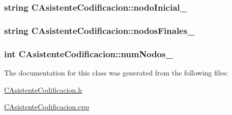 \subsubsection[{\texorpdfstring{nodo\+Inicial\+\_\+}{nodoInicial_}}]{\setlength{\rightskip}{0pt plus 5cm}string C\+Asistente\+Codificacion\+::nodo\+Inicial\+\_\+\hspace{0.3cm}{\ttfamily [private]}}\hypertarget{classCAsistenteCodificacion_ad0d97f8664aa927a414b7fe17b6106d4}{}\label{classCAsistenteCodificacion_ad0d97f8664aa927a414b7fe17b6106d4}
\subsubsection[{\texorpdfstring{nodos\+Finales\+\_\+}{nodosFinales_}}]{\setlength{\rightskip}{0pt plus 5cm}string C\+Asistente\+Codificacion\+::nodos\+Finales\+\_\+\hspace{0.3cm}{\ttfamily [private]}}\hypertarget{classCAsistenteCodificacion_afa94c6d482da4f5eb193ddd7211db25f}{}\label{classCAsistenteCodificacion_afa94c6d482da4f5eb193ddd7211db25f}
\subsubsection[{\texorpdfstring{num\+Nodos\+\_\+}{numNodos_}}]{\setlength{\rightskip}{0pt plus 5cm}int C\+Asistente\+Codificacion\+::num\+Nodos\+\_\+\hspace{0.3cm}{\ttfamily [private]}}\hypertarget{classCAsistenteCodificacion_a3c77dcdb74837345c1da4a6a7051ee4e}{}\label{classCAsistenteCodificacion_a3c77dcdb74837345c1da4a6a7051ee4e}


The documentation for this class was generated from the following files\+:\begin{DoxyCompactItemize}
\item 
\hyperlink{CAsistenteCodificacion_8h}{C\+Asistente\+Codificacion.\+h}\item 
\hyperlink{CAsistenteCodificacion_8cpp}{C\+Asistente\+Codificacion.\+cpp}\end{DoxyCompactItemize}
